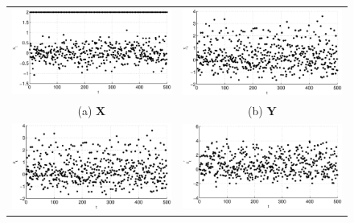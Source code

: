 \begin{figure}[ht]
\begin{tabular}{cc}
\includegraphics[scale=0.48]{NoisyMultiResponseExample_X.eps} & \includegraphics[scale=0.48]{NoisyMultiResponseExample_Y.eps} \\
(a) $\mathbf{X}$ & (b) $\mathbf{Y}$ \\
\includegraphics[scale=0.48]{NoisyMultiResponseExample_z1.eps} & \includegraphics[scale=0.48]{NoisyMultiResponseExample_z2.eps} \\

\end{tabular}
\end{figure}
